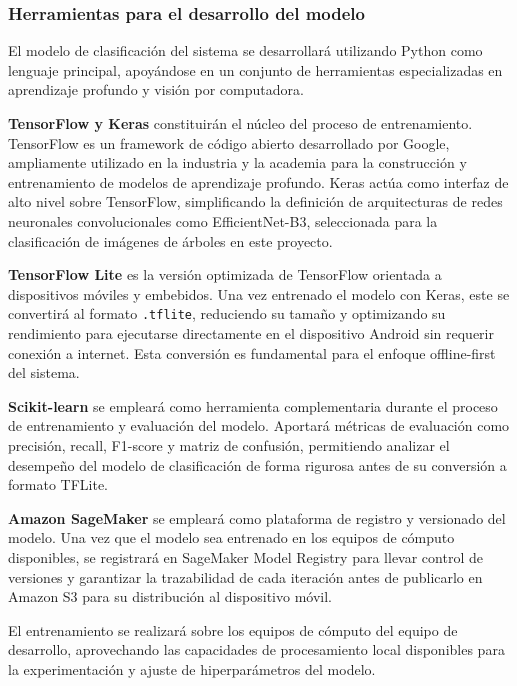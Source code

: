 \subsubsection{Herramientas para el desarrollo del modelo}

El modelo de clasificación del sistema se desarrollará utilizando
Python como lenguaje principal, apoyándose en un conjunto de
herramientas especializadas en aprendizaje profundo y visión por
computadora.

\textbf{TensorFlow y Keras} constituirán el núcleo del proceso de
entrenamiento. TensorFlow es un framework de código abierto desarrollado
por Google, ampliamente utilizado en la industria y la academia para
la construcción y entrenamiento de modelos de aprendizaje profundo.
Keras actúa como interfaz de alto nivel sobre TensorFlow, simplificando
la definición de arquitecturas de redes neuronales convolucionales como
EfficientNet-B3, seleccionada para la clasificación de imágenes de
árboles en este proyecto.

\textbf{TensorFlow Lite} es la versión optimizada de TensorFlow
orientada a dispositivos móviles y embebidos. Una vez entrenado el
modelo con Keras, este se convertirá al formato \texttt{.tflite},
reduciendo su tamaño y optimizando su rendimiento para ejecutarse
directamente en el dispositivo Android sin requerir conexión a internet.
Esta conversión es fundamental para el enfoque offline-first del sistema.

\textbf{Scikit-learn} se empleará como herramienta complementaria
durante el proceso de entrenamiento y evaluación del modelo. Aportará
métricas de evaluación como precisión, recall, F1-score y matriz de
confusión, permitiendo analizar el desempeño del modelo de clasificación
de forma rigurosa antes de su conversión a formato TFLite.

\textbf{Amazon SageMaker} se empleará como plataforma de registro y
versionado del modelo. Una vez que el modelo sea entrenado en los
equipos de cómputo disponibles, se registrará en SageMaker Model
Registry para llevar control de versiones y garantizar la trazabilidad
de cada iteración antes de publicarlo en Amazon S3 para su distribución
al dispositivo móvil.

El entrenamiento se realizará sobre los equipos de cómputo del equipo
de desarrollo, aprovechando las capacidades de procesamiento local
disponibles para la experimentación y ajuste de hiperparámetros del
modelo.
